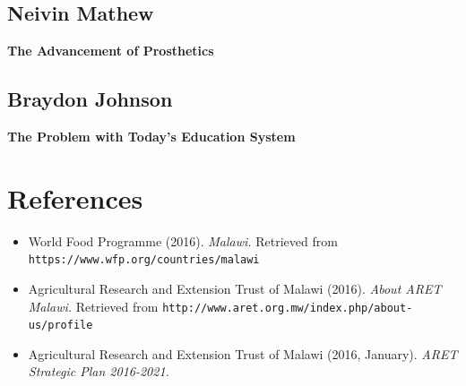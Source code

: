 \documentclass[12pt,letterpaper]{article}
\begin{document}
\clearpage
\subsection{Neivin Mathew}
\textbf{The Advancement of Prosthetics}\par

\clearpage
\subsection{Braydon Johnson}
\textbf{The Problem with Today's Education System}\par


\clearpage
\section{References}
\begin{flushleft}
\begin{itemize}[leftmargin=12pt]

\item World Food Programme (2016). \emph{Malawi.}
 Retrieved from \texttt{https://www.wfp.org/countries/malawi}

\item Agricultural Research and Extension Trust of Malawi (2016). \emph{About ARET Malawi.}
Retrieved from \texttt{http://www.aret.org.mw/index.php/about-us/profile}

\item Agricultural Research and Extension Trust of Malawi (2016, January). \emph{ARET Strategic Plan 2016-2021.}


\end{itemize}
\end{flushleft}   
\end{document}
